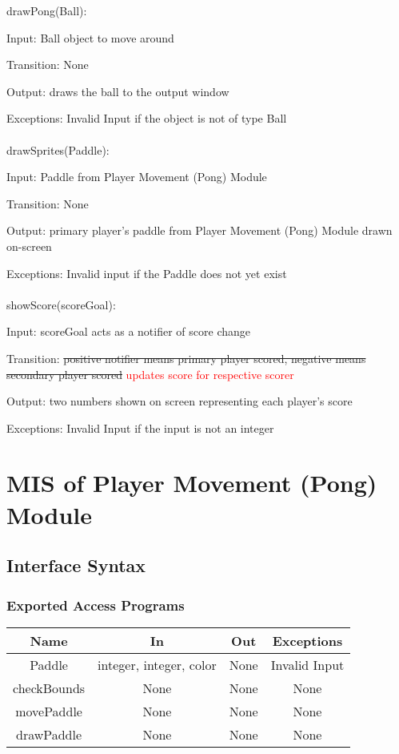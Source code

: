 \documentclass[12pt, titlepage]{article}
\begin{document}
		drawPong(Ball):
		
		Input: Ball object to move around
		
		Transition: None
		
		Output: draws the ball to the output window
		
		Exceptions: Invalid Input if the object is not of type Ball\\
		\\
		drawSprites(Paddle):
		
		Input: Paddle from Player Movement (Pong) Module
		
		Transition: None
		
		Output: primary player's paddle from Player Movement (Pong) Module drawn on-screen
		
		Exceptions: Invalid input if the Paddle does not yet exist\\
		\\
		showScore(scoreGoal):
		
		Input: scoreGoal acts as a notifier of score change
		
		Transition: \sout{positive notifier means primary player scored, negative means secondary player scored} \textcolor{red}{updates score for respective scorer}
		
		Output: two numbers shown on screen representing each player's score
		
		Exceptions: Invalid Input if the input is not an integer
		
\section{MIS of Player Movement (Pong) Module}
		\subsection{Interface Syntax}
		\subsubsection{Exported Access Programs}
		\begin{tabular}[pos]{|c|c|c|c|}
			\hline
			\textbf{Name}& \textbf{In} & \textbf{Out} & \textbf{Exceptions} \\ \hline
			Paddle & integer, integer, color & None & Invalid Input \\ \hline
			checkBounds & None & None & None \\ \hline
			movePaddle & None & None & None \\ \hline
			drawPaddle & None & None & None \\ \hline
		\end{tabular}
		
\end{document}
